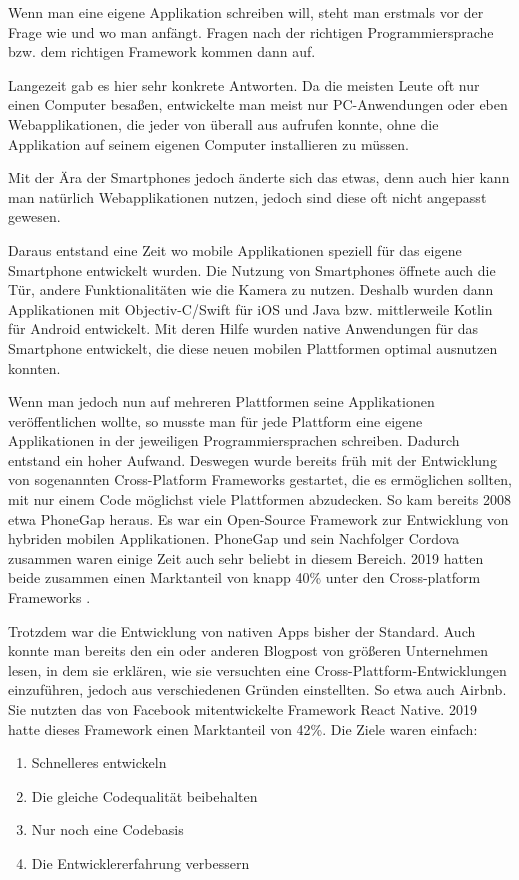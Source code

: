 Wenn man eine eigene Applikation schreiben will, steht man erstmals vor der Frage wie und wo man anfängt.
Fragen nach der richtigen Programmiersprache bzw. dem richtigen Framework kommen dann auf.

Langezeit gab es hier sehr konkrete Antworten. Da die meisten Leute oft nur einen Computer besaßen, entwickelte man meist nur PC-Anwendungen oder eben Webapplikationen, die jeder von überall aus aufrufen konnte, ohne die Applikation auf seinem eigenen Computer installieren zu müssen.

Mit der Ära der Smartphones jedoch änderte sich das etwas, denn auch hier kann man natürlich Webapplikationen nutzen, jedoch sind diese oft nicht angepasst gewesen.

Daraus entstand eine Zeit wo mobile Applikationen speziell für das eigene Smartphone entwickelt wurden. Die Nutzung von Smartphones öffnete auch die Tür, andere Funktionalitäten wie die Kamera zu nutzen. Deshalb wurden dann Applikationen mit Objectiv-C/Swift für iOS und Java bzw. mittlerweile Kotlin für Android entwickelt. Mit deren Hilfe wurden native Anwendungen für das Smartphone entwickelt, die diese neuen mobilen Plattformen optimal ausnutzen konnten.

Wenn man jedoch nun auf mehreren Plattformen seine Applikationen veröffentlichen wollte, so musste man für jede Plattform eine eigene Applikationen in der jeweiligen Programmiersprachen schreiben. Dadurch entstand ein hoher Aufwand. Deswegen wurde bereits früh mit der Entwicklung von sogenannten Cross-Platform Frameworks gestartet, die es ermöglichen sollten, mit nur einem Code möglichst viele Plattformen abzudecken. So kam bereits 2008 etwa PhoneGap heraus. Es war ein Open-Source Framework zur Entwicklung von hybriden mobilen Applikationen. PhoneGap und sein Nachfolger Cordova zusammen waren einige Zeit auch sehr beliebt in diesem Bereich. 2019 hatten beide zusammen einen Marktanteil von knapp 40\% unter den Cross-platform Frameworks \cite{statist_CP_Framework}.

Trotzdem war die Entwicklung von nativen Apps bisher der Standard. Auch konnte man bereits den ein oder anderen Blogpost von größeren Unternehmen lesen, in dem sie erklären, wie sie versuchten eine  Cross-Plattform-Entwicklungen einzuführen, jedoch aus verschiedenen Gründen einstellten. So etwa auch Airbnb. Sie nutzten das von Facebook mitentwickelte Framework React Native. 2019 hatte dieses Framework einen Marktanteil von 42\%. 
\break
Die Ziele waren einfach:
\begin{enumerate}
    \item Schnelleres entwickeln
    \item Die gleiche Codequalität beibehalten
    \item Nur noch eine Codebasis
    \item Die Entwicklererfahrung verbessern\cite{Airbnb_react_goals}
\end{enumerate}

